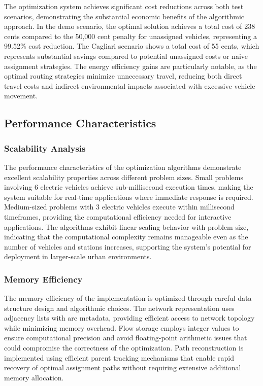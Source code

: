 \documentclass[12pt,a4paper]{article}
\begin{document}
The optimization system achieves significant cost reductions across both test scenarios, demonstrating the substantial economic benefits of the algorithmic approach. In the demo scenario, the optimal solution achieves a total cost of 238 cents compared to the 50,000 cent penalty for unassigned vehicles, representing a 99.52\% cost reduction. The Cagliari scenario shows a total cost of 55 cents, which represents substantial savings compared to potential unassigned costs or naive assignment strategies. The energy efficiency gains are particularly notable, as the optimal routing strategies minimize unnecessary travel, reducing both direct travel costs and indirect environmental impacts associated with excessive vehicle movement.

\subsection{Performance Characteristics}

\subsubsection{Scalability Analysis}

The performance characteristics of the optimization algorithms demonstrate excellent scalability properties across different problem sizes. Small problems involving 6 electric vehicles achieve sub-millisecond execution times, making the system suitable for real-time applications where immediate response is required. Medium-sized problems with 3 electric vehicles execute within millisecond timeframes, providing the computational efficiency needed for interactive applications. The algorithms exhibit linear scaling behavior with problem size, indicating that the computational complexity remains manageable even as the number of vehicles and stations increases, supporting the system's potential for deployment in larger-scale urban environments.

\subsubsection{Memory Efficiency}

The memory efficiency of the implementation is optimized through careful data structure design and algorithmic choices. The network representation uses adjacency lists with arc metadata, providing efficient access to network topology while minimizing memory overhead. Flow storage employs integer values to ensure computational precision and avoid floating-point arithmetic issues that could compromise the correctness of the optimization. Path reconstruction is implemented using efficient parent tracking mechanisms that enable rapid recovery of optimal assignment paths without requiring extensive additional memory allocation.
\end{document}
